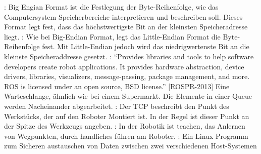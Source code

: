 \begin{acronym}
 : Big Engian Format ist die Festlegung der Byte-Reihenfolge, wie das Computersystem Speicherbereiche interpretieren und beschreiben soll. Dieses Format legt fest, dass das höchstwertigste Bit an der kleinsten Speicheradresse liegt.
 : Wie bei \acs{Big-Endian Format}, legt das Little-Endian Format die Byte-Reihenfolge fest. Mit Little-Endian jedoch wird das niedrigwertenste Bit an die kleinste Speicheraddresse gesetzt.
 : ``Provides libraries and tools to help software developers create robot applications. It provides hardware abstraction, device drivers, libraries, visualizers, message-passing, package management, and more. ROS is licensed under an open source, BSD license.'' [ROSPR-2013]
  Eine Warteschlange, ähnlich wie bei einem Supermarkt. Die Elemente in einer Queue werden Nacheinander abgearbeitet. 
 : Der TCP beschreibt den Punkt des Werkstücks, der auf den Roboter Montiert ist. In der Regel ist dieser Punkt an der Spitze des Werkzeugs angeben.
 : In der Robotik ist teachen, das Anlernen von Wegpunkten, durch handliches führen am Roboter.
 : Ein Linux Programm zum Sicheren austauschen von Daten zwischen zwei verschiedenen Host-Systemen
\end{acronym}
